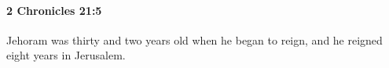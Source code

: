
		\paragraph{2 Chronicles 21:5} %
			\label{2CHRONICLES-21-5}

			Jehoram was thirty and two years old when he began to reign, and he reigned eight years in Jerusalem.


